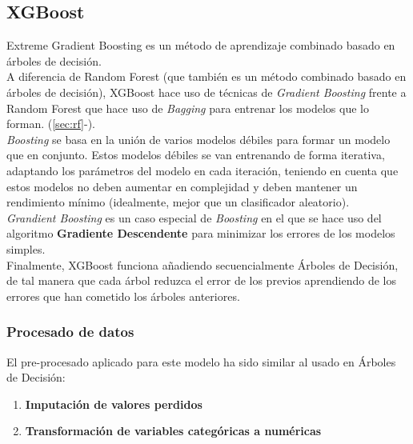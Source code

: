 \subsection{XGBoost}
Extreme Gradient Boosting  es un método de aprendizaje combinado basado en árboles de decisión.\\
A diferencia de Random Forest (que también es un método combinado basado en árboles de decisión), XGBoost hace uso de técnicas de \textit{Gradient Boosting}  frente a Random Forest que hace uso de \textit{Bagging} para entrenar los modelos que lo forman. (\ref{sec:rf}-).\\
\linebreak
\textit{Boosting} se basa en la unión de varios modelos débiles para formar un modelo que en conjunto. Estos modelos débiles se van entrenando de forma iterativa, adaptando los parámetros del modelo en cada iteración,  teniendo en cuenta que estos modelos no deben aumentar en complejidad y deben mantener un rendimiento mínimo (idealmente, mejor que un clasificador aleatorio).\\
\linebreak
\textit{Grandient Boosting} es un caso especial de \textit{Boosting} en el que se hace uso del algoritmo  \textbf{Gradiente Descendente} para minimizar los errores de los modelos simples.\\
\linebreak
Finalmente, XGBoost funciona añadiendo secuencialmente Árboles de Decisión, de tal manera que cada árbol reduzca el error de los previos aprendiendo de los errores que han cometido los árboles anteriores.
\subsubsection*{Procesado de datos}
El pre-procesado aplicado para este modelo ha sido similar al usado en Árboles de Decisión:
\begin{enumerate}
	\item \textbf{Imputación de valores perdidos}
	\item \textbf{Transformación de variables categóricas a numéricas}
\end{enumerate}
